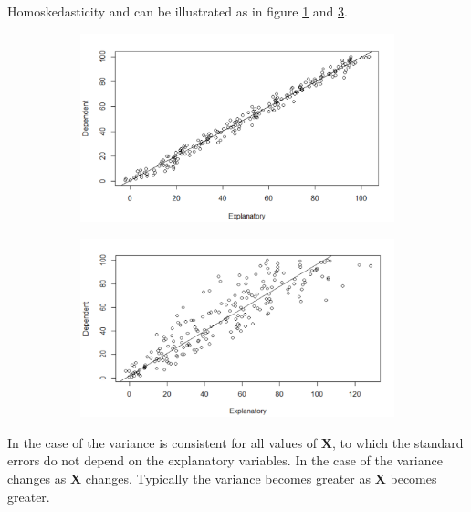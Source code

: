 Homoskedasticity and \hetero can be illustrated as in figure \ref{fig:homo_with_dependent_up_axis} and \ref{fig:hetero_with_dependent_up_axis}. 
\begin{figure}[h]
\centering
\begin{subfigure}[b]{0.5\textwidth}
    \centering
    \includegraphics[width = \textwidth]{figures/Thea/homoplot.png}
    \caption{\homo}
    \label{fig:homo_with_dependent_up_axis}
\end{subfigure}%
\begin{subfigure}[b]{0.5\textwidth}
\centering
    \includegraphics[width = \textwidth]{figures/Thea/Heteroplot.png}
    \caption{\hetero}
    \label{fig:hetero_with_dependent_up_axis}
\end{subfigure}
\end{figure}
In the case of \homo the variance is consistent for all values of $\mathbf{X}$, to which the standard errors do not depend on the explanatory variables.
In the case of \hetero the variance changes as $\mathbf{X}$ changes. Typically the variance becomes greater as $\mathbf{X}$ becomes greater.

